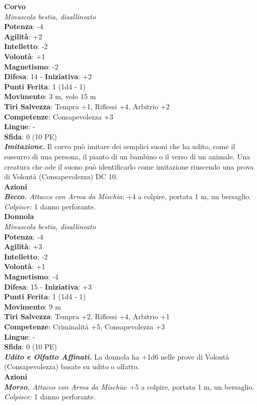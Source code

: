 \begin{multicols}{2}
\medskip\textbf{Corvo}\\
\emph{Minuscola bestia, disallineato}\\
\textbf{Potenza}: -4\\
\textbf{Agilità}: +2\\
\textbf{Intelletto}: -2\\
\textbf{Volontà}: +1\\
\textbf{Magnetismo}: -2\\
\textbf{Difesa}: 14 - \textbf{Iniziativa}: +2\\
\textbf{Punti Ferita}: 1 (1d4 - 1)\\
\textbf{Movimento}: 3 m, volo 15 m\\
\textbf{Tiri Salvezza}: Tempra +1, Riflessi +4, Arbitrio +2 \\
\textbf{Competenze}: Consapevolezza +3\\
\textbf{Lingue}: -\\
\textbf{Sfida}: 0 (10 PE)\smallskip\\
\emph{\textbf{Imitazione.}} Il corvo può imitare dei semplici suoni che ha udito, come il sussurro di una persona, il pianto di un bambino o il verso di un animale. Una creatura che ode il suono può identificarlo come imitazione riuscendo una prova di Volontà (Consapevolezza) DC 10.\\
\smallskip\textbf{Azioni}\\
\emph{\textbf{Becco.} Attacco con Arma da Mischia}: +4 a colpire, portata 1 m, un bersaglio.\\
\emph{Colpisce:} 1 danno perforante.\\


\medskip\textbf{Donnola}\\
\emph{Minuscola bestia, disallineato}\\
\textbf{Potenza}: -4\\
\textbf{Agilità}: +3\\
\textbf{Intelletto}: -2\\
\textbf{Volontà}: +1\\
\textbf{Magnetismo}: -4\\
\textbf{Difesa}: 15 - \textbf{Iniziativa}: +3\\
\textbf{Punti Ferita}: 1 (1d4 - 1)\\
\textbf{Movimento}: 9 m\\
\textbf{Tiri Salvezza}: Tempra +2, Riflessi +4, Arbitrio +1\\
\textbf{Competenze}: Criminalità +5, Consapevolezza +3\\
\textbf{Lingue}: -\\
\textbf{Sfida}: 0 (10 PE)\smallskip\\
\emph{\textbf{Udito e Olfatto Affinati.}} La donnola ha +1d6 nelle prove di Volontà (Consapevolezza) basate su udito o olfatto.\\
\smallskip\textbf{Azioni}\\
\emph{\textbf{Morso.} Attacco con Arma da Mischia}: +5 a colpire, portata 1 m, un bersaglio.\\
\emph{Colpisce:} 1 danno perforante.\\



\end{multicols}
